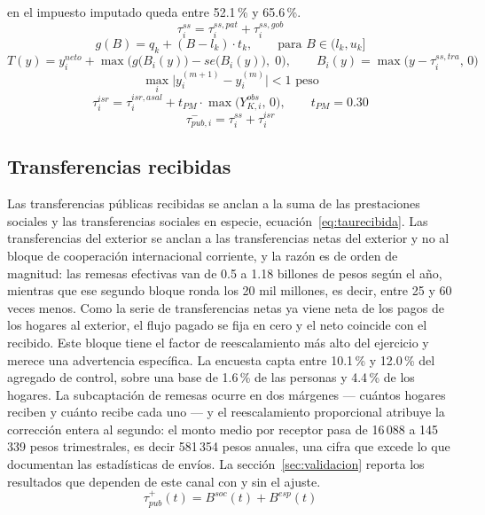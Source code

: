\documentclass[11pt,a4paper]{article}
\begin{document}
en el impuesto imputado queda entre 52.1\,\% y 65.6\,\%.
\begin{equation}
\label{eq:css}
\tau^{ss}_i = \tau^{ss,pat}_i + \tau^{ss,gob}_i
\end{equation}
\begin{equation}
\label{eq:isr1}
g(B) = q_k + (B - l_k)\cdot t_k, \qquad \text{para } B \in (l_k, u_k]
\end{equation}
\begin{equation}
\label{eq:isr2}
T(y) = y^{neto}_i + \max\Big( g\big(B_i(y)\big) - se\big(B_i(y)\big),\; 0 \Big),
\qquad B_i(y) = \max\big(y - \tau^{ss,tra}_i,\,0\big)
\end{equation}
\begin{equation}
\label{eq:isrconv}
\max_i \big| y^{(m+1)}_i - y^{(m)}_i \big| < 1 \text{ peso}
\end{equation}
\begin{equation}
\label{eq:isrpm}
\tau^{isr}_i = \tau^{isr,asal}_i + t_{PM}\cdot \max\big(Y^{obs}_{K,i},\,0\big),
\qquad t_{PM} = 0.30
\end{equation}
\begin{equation}
\label{eq:taupagada}
\tau^{-}_{pub,i} = \tau^{ss}_i + \tau^{isr}_i
\end{equation}
\subsection{Transferencias recibidas}
Las transferencias públicas recibidas se anclan a la suma de las prestaciones sociales y las
transferencias sociales en especie, ecuación~\eqref{eq:taurecibida}. Las transferencias del
exterior se anclan a las transferencias netas del exterior y no al bloque de cooperación
internacional corriente, y la razón es de orden de magnitud: las remesas efectivas van de 0.5 a
1.18 billones de pesos según el año, mientras que ese segundo bloque ronda los 20 mil millones,
es decir, entre 25 y 60 veces menos. Como la serie de transferencias netas ya viene neta de los
pagos de los hogares al exterior, el flujo pagado se fija en cero y el
neto coincide con el recibido.
Este bloque tiene el factor de reescalamiento más alto del ejercicio y merece una advertencia
específica. La encuesta capta entre 10.1\,\% y 12.0\,\% del agregado de control, sobre una base
de 1.6\,\% de las personas y 4.4\,\% de los hogares. La subcaptación de remesas ocurre en dos
márgenes --- cuántos hogares reciben y cuánto recibe cada uno --- y el reescalamiento proporcional
atribuye la corrección entera al segundo: el monto medio por receptor pasa de 16\,088 a
145\,339 pesos trimestrales, es decir 581\,354 pesos anuales, una cifra que excede lo que
documentan las estadísticas de envíos. La sección~\ref{sec:validacion} reporta los resultados que
dependen de este canal con y sin el ajuste.
\begin{equation}
\label{eq:taurecibida}
\tau^{+}_{pub}(t) = B^{soc}(t) + B^{esp}(t)
\end{equation}
\end{document}
